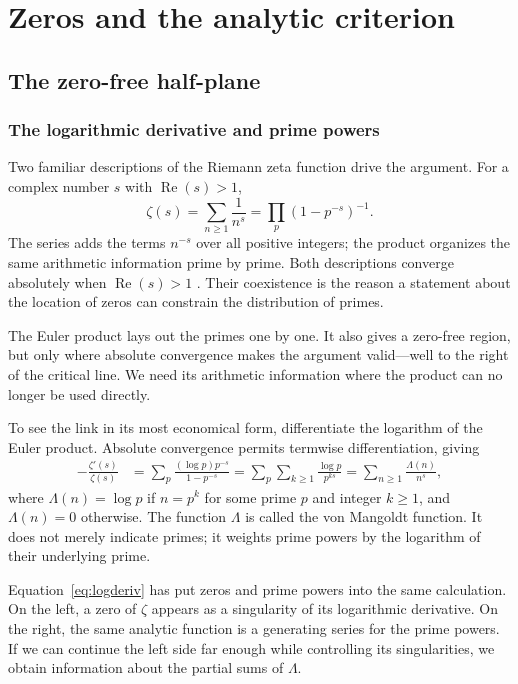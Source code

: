 \documentclass[11pt,openany,oneside]{scrbook}
\theoremstyle{definition}
\theoremstyle{remark}
\newcommand{\Rea}{\operatorname{Re}}
\begin{document}
\tableofcontents
\mainmatter
\part{Zeros and the analytic criterion}

\chapter{The zero-free half-plane}\label{ch:halfplane}
\section{The logarithmic derivative and prime powers}
Two familiar descriptions of the Riemann zeta function drive the argument. For a complex number $s$ with $\Rea(s)>1$,
\begin{equation}\label{eq:euler}
\zeta(s)=\sum_{n\ge1}\frac1{n^s}=\prod_p(1-p^{-s})^{-1}.
\end{equation}
The series adds the terms $n^{-s}$ over all positive integers; the product organizes the same arithmetic information prime by prime. Both descriptions converge absolutely when $\Rea(s)>1$ \parencite{Davenport2000,IwaniecKowalski2004}. Their coexistence is the reason a statement about the location of zeros can constrain the distribution of primes.

The Euler product lays out the primes one by one. It also gives a zero-free region, but only where absolute convergence makes the argument valid—well to the right of the critical line. We need its arithmetic information where the product can no longer be used directly.

To see the link in its most economical form, differentiate the logarithm of the Euler product. Absolute convergence permits termwise differentiation, giving
\begin{align}\label{eq:logderiv}
-\frac{\zeta'(s)}{\zeta(s)}
 &=\sum_p\frac{(\log p)p^{-s}}{1-p^{-s}}
 =\sum_p\sum_{k\ge1}\frac{\log p}{p^{ks}}
 =\sum_{n\ge1}\frac{\Lambda(n)}{n^s},
\end{align}
where $\Lambda(n)=\log p$ if $n=p^k$ for some prime $p$ and integer $k\ge1$, and $\Lambda(n)=0$ otherwise. The function $\Lambda$ is called the von Mangoldt function. It does not merely indicate primes; it weights prime powers by the logarithm of their underlying prime.

Equation~\eqref{eq:logderiv} has put zeros and prime powers into the same calculation. On the left, a zero of $\zeta$ appears as a singularity of its logarithmic derivative. On the right, the same analytic function is a generating series for the prime powers. If we can continue the left side far enough while controlling its singularities, we obtain information about the partial sums of $\Lambda$.
\end{document}
